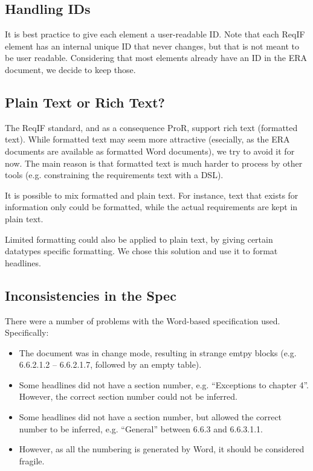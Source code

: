 \documentclass{template/openetcs_report}
\begin{document}
\subsection{Handling IDs}

It is best practice to give each element a user-readable ID.  Note that each ReqIF element has an internal unique ID that never changes, but that is not meant to be user readable.  Considering that most elements already have an ID in the ERA document, we decide to keep those.  

\subsection{Plain Text or Rich Text?}

The ReqIF standard, and as a consequence ProR, support rich text (formatted text).  While formatted text may seem more attractive (esecially, as the ERA documents are available as formatted Word documents), we try to avoid it for now.  The main reason is that formatted text is much harder to process by other tools (e.g. constraining the requirements text with a DSL).

It is possible to mix formatted and plain text.  For instance, text that exists for information only could be formatted, while the actual requirements are kept in plain text.

Limited formatting could also be applied to plain text, by giving certain datatypes specific formatting.  We chose this solution and use it to format headlines.

\subsection{Inconsistencies in the Spec}

There were a number of problems with the Word-based specification used.  Specifically:

\begin{itemize}

\item The document was in change mode, resulting in strange emtpy blocks (e.g. 6.6.2.1.2 -- 6.6.2.1.7, followed by an empty table).

\item Some headlines did not have a section number, e.g. ``Exceptions to chapter 4''.  However, the correct section number could not be inferred.

\item Some headlines did not have a section number, but allowed the correct number to be inferred, e.g. ``General'' between 6.6.3 and 6.6.3.1.1.

\item However, as all the numbering is generated by Word, it should be considered fragile.

\end{itemize}
\end{document}
